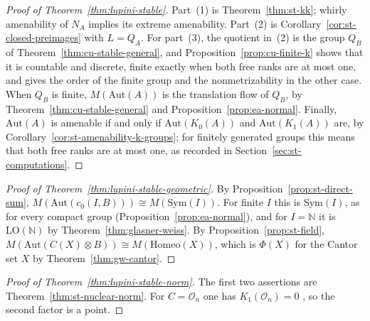 \begin{proof}[Proof of Theorem~\ref{thm:lupini-stable}]
Part~(1) is Theorem~\ref{thm:st-kk}; whirly amenability of $N_A$ implies its
extreme amenability. Part~(2) is Corollary~\ref{cor:st-closed-preimages} with
$L=Q_A$. For part~(3), the quotient in~(2) is the group $Q_B$ of
Theorem~\ref{thm:cu-stable-general}, and Proposition~\ref{prop:cu-finite-k}
shows that it is countable and discrete, finite exactly when both free ranks
are at most one, and gives the order of the finite group and the
nonmetrizability in the other case. When $Q_B$ is finite,
$M(\mathrm{Aut}(A))$ is the translation flow of $Q_B$, by
Theorem~\ref{thm:cu-stable-general} and Proposition~\ref{prop:ea-normal}.
Finally, $\mathrm{Aut}(A)$ is amenable if and only if
$\mathrm{Aut}(K_0(A))$ and $\mathrm{Aut}(K_1(A))$ are, by
Corollary~\ref{cor:st-amenability-k-groups}; for finitely generated groups
this means that both free ranks are at most one, as recorded in
Section~\ref{sec:st-computations}.
\end{proof}

\begin{proof}[Proof of Theorem~\ref{thm:lupini-stable-geometric}]
By Proposition~\ref{prop:st-direct-sum},
$M(\mathrm{Aut}(c_0(I,B)))\cong M(\mathrm{Sym}(I))$. For finite $I$ this is
$\mathrm{Sym}(I)$, as for every compact group
(Proposition~\ref{prop:ea-normal}), and for $I=\mathbb{N}$ it is
$\mathrm{LO}(\mathbb{N})$ by Theorem~\ref{thm:glasner-weiss}. By
Proposition~\ref{prop:st-field},
$M(\mathrm{Aut}(C(X)\otimes B))\cong M(\mathrm{Homeo}(X))$, which is $\Phi(X)$
for the Cantor set $X$ by Theorem~\ref{thm:gw-cantor}.
\end{proof}

\begin{proof}[Proof of Theorem~\ref{thm:lupini-stable-norm}]
The first two assertions are Theorem~\ref{thm:st-nuclear-norm}. For
$C=\mathcal{O}_n$ one has $K_1(\mathcal{O}_n)=0$ \cite{Cuntz1981}, so the
second factor is a point.
\end{proof}
